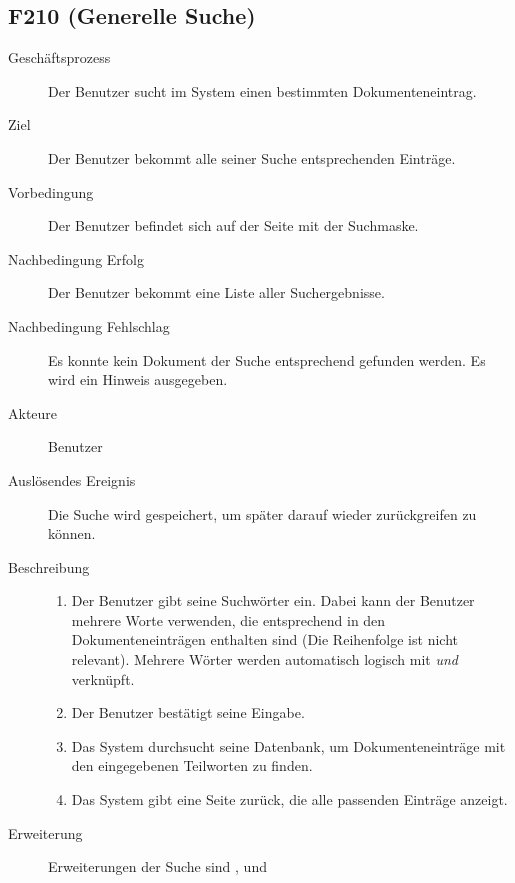 \subsection{F210 (Generelle Suche)}
\label{F:Suche}
\begin{description}
  \item[Geschäftsprozess]Der Benutzer sucht im System einen bestimmten Dokumenteneintrag.
  \item[Ziel]Der Benutzer bekommt alle seiner Suche entsprechenden Einträge.
  \item[Vorbedingung]Der Benutzer befindet sich auf der Seite mit der Suchmaske.
  \item[Nachbedingung Erfolg]Der Benutzer bekommt eine Liste aller Suchergebnisse.
  \item[Nachbedingung Fehlschlag]Es konnte kein Dokument der Suche entsprechend gefunden werden. Es wird ein Hinweis ausgegeben.
  \item[Akteure]Benutzer
  \item[Auslösendes Ereignis]Die Suche wird gespeichert, um später darauf wieder zurückgreifen zu können.
  \item[Beschreibung]\hfill
    \begin{enumerate}
      \item Der Benutzer gibt seine Suchwörter ein. Dabei kann der Benutzer mehrere Worte verwenden, die entsprechend in den Dokumenteneinträgen enthalten sind (Die Reihenfolge ist nicht relevant). Mehrere Wörter werden automatisch logisch mit \emph{und} verknüpft.
      \item Der Benutzer bestätigt seine Eingabe.
      \item Das System durchsucht seine Datenbank, um Dokumenteneinträge mit den eingegebenen Teilworten zu finden.
      \item Das System gibt eine Seite zurück, die alle passenden Einträge anzeigt.
    \end{enumerate}
    \item[Erweiterung]Erweiterungen der Suche sind ,  und 
\end{description}


